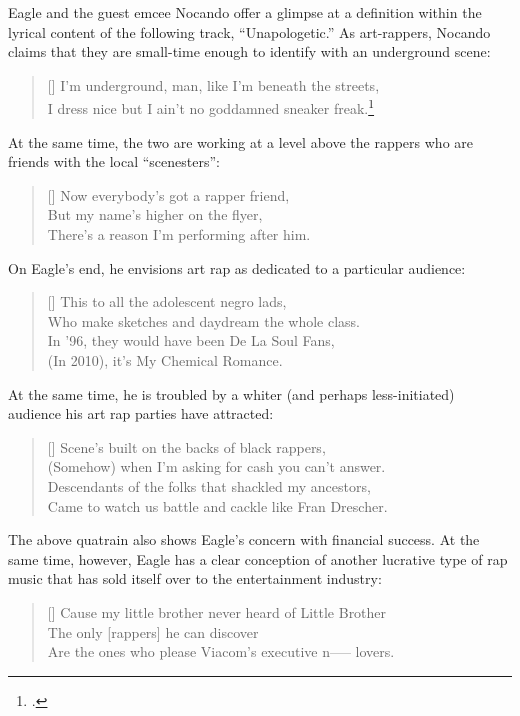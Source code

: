 Eagle and the guest emcee Nocando offer a glimpse at a definition within the lyrical content of the following
track, ``Unapologetic.'' As art-rappers, Nocando claims that they are small-time enough to identify with 
an underground scene:
\settowidth{\versewidth}{I dress nice but I ain't no goddamned sneaker freak.}
    \begin{verse}[\versewidth]
        I'm underground, man, like I'm beneath the streets, \\ 
        I dress nice but I ain't no goddamned sneaker freak.\footnote{
            \cite{openmikeeagle2010}.}
    \end{verse}
At the same time, the two are working at a level above the rappers who are friends with the local 
``scenesters'':
\settowidth{\versewidth}{There's a reason I'm performing after him.}
    \begin{verse}[\versewidth]
        Now everybody's got a rapper friend, \\ 
        But my name's higher on the flyer,\\
        There's a reason I'm performing after him.
    \end{verse}
On Eagle's end, he envisions art rap as dedicated to a particular audience:
\settowidth{\versewidth}{Who make sketches and daydream the whole class.}
    \begin{verse}[\versewidth]
        This to all the adolescent negro lads, \\
        Who make sketches and daydream the whole class. \\
        In '96, they would have been De La Soul Fans, \\
        (In 2010), it's My Chemical Romance.
    \end{verse}
At the same time, he is troubled by a whiter (and perhaps less-initiated) audience his art rap 
parties have attracted:
\settowidth{\versewidth}{Came to watch us battle and cackle like Fran Drescher.}
    \begin{verse}[\versewidth]
        Scene's built on the backs of black rappers, \\
        (Somehow) when I'm asking for cash you can't answer. \\ 
        Descendants of the folks that shackled my ancestors, \\ 
        Came to watch us battle and cackle like Fran Drescher.
    \end{verse}
The above quatrain also shows Eagle's concern with financial success. At the same time, however, Eagle has a
clear conception of another lucrative type of rap music that has sold itself over to the entertainment 
industry:
\settowidth{\versewidth}{Cause my little brother never heard of Little Brother \textellipsis}
    \begin{verse}[\versewidth]
        Cause my little brother never heard of Little Brother \textellipsis \\ 
        The only [rappers] he can discover \\
        Are the ones who please Viacom's executive n----- lovers.
    \end{verse}

